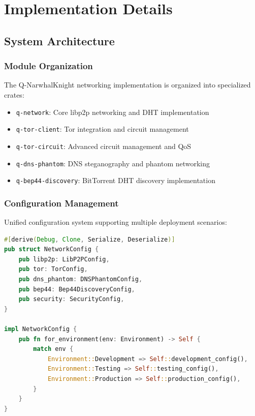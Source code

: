 \documentclass[11pt,a4paper]{article}
\theoremstyle{definition}
\theoremstyle{remark}
\begin{document}
\section{Implementation Details}

\subsection{System Architecture}

\subsubsection{Module Organization}

The Q-NarwhalKnight networking implementation is organized into specialized crates:

\begin{itemize}
    \item \texttt{q-network}: Core libp2p networking and DHT implementation
    \item \texttt{q-tor-client}: Tor integration and circuit management
    \item \texttt{q-tor-circuit}: Advanced circuit management and QoS
    \item \texttt{q-dns-phantom}: DNS steganography and phantom networking
    \item \texttt{q-bep44-discovery}: BitTorrent DHT discovery implementation
\end{itemize}

\subsubsection{Configuration Management}

Unified configuration system supporting multiple deployment scenarios:

\begin{lstlisting}[language=Rust, caption=Network Configuration]
#[derive(Debug, Clone, Serialize, Deserialize)]
pub struct NetworkConfig {
    pub libp2p: LibP2PConfig,
    pub tor: TorConfig,
    pub dns_phantom: DNSPhantomConfig,
    pub bep44: Bep44DiscoveryConfig,
    pub security: SecurityConfig,
}

impl NetworkConfig {
    pub fn for_environment(env: Environment) -> Self {
        match env {
            Environment::Development => Self::development_config(),
            Environment::Testing => Self::testing_config(),
            Environment::Production => Self::production_config(),
        }
    }
}
\end{lstlisting}
\end{document}
